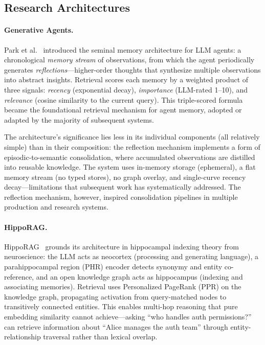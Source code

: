 \subsection{Research Architectures}
\label{sec:research}

\paragraph{Generative Agents.}
Park et al.~\cite{park2023generative} introduced the seminal memory
architecture for LLM agents: a chronological \emph{memory stream} of
observations, from which the agent periodically generates
\emph{reflections}---higher-order thoughts that synthesize multiple
observations into abstract insights. Retrieval scores each memory by a
weighted product of three signals: \emph{recency} (exponential decay),
\emph{importance} (LLM-rated 1--10), and \emph{relevance} (cosine
similarity to the current query). This triple-scored formula became the
foundational retrieval mechanism for agent memory, adopted or adapted
by the majority of subsequent systems.

The architecture's significance lies less in its individual components
(all relatively simple) than in their composition: the reflection
mechanism implements a form of episodic-to-semantic consolidation,
where accumulated observations are distilled into reusable knowledge.
The system uses in-memory storage (ephemeral), a flat memory stream
(no typed stores), no graph overlay, and single-curve recency
decay---limitations that subsequent work has systematically addressed.
The reflection mechanism, however, inspired consolidation pipelines
in multiple production and research systems.

\paragraph{HippoRAG.}
HippoRAG~\cite{gutierrez2024hipporag} grounds its architecture in
hippocampal indexing theory from neuroscience: the LLM acts as
neocortex (processing and generating language), a parahippocampal
region (PHR) encoder detects synonymy and entity co-reference, and an
open knowledge graph acts as hippocampus (indexing and associating
memories). Retrieval uses Personalized PageRank (PPR) on the knowledge
graph, propagating activation from query-matched nodes to
transitively connected entities. This enables multi-hop reasoning that
pure embedding similarity cannot achieve---asking ``who handles auth
permissions?'' can retrieve information about ``Alice manages the auth
team'' through entity-relationship traversal rather than lexical
overlap.

